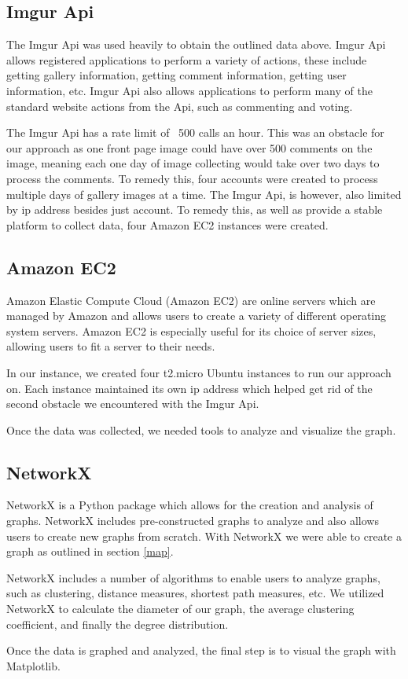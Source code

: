 \documentclass{article}
\begin{document}
\subsection{Imgur Api}
The Imgur Api\cite{imgurapi} was used heavily to obtain the outlined data above. Imgur Api allows registered applications to perform a variety of actions, these include getting gallery information, getting comment information, getting user information, etc. Imgur Api also allows applications to perform many of the standard website actions from the Api, such as commenting and voting. 
\par The Imgur Api has a rate limit of ~500 calls an hour. This was an obstacle for our approach as one front page image could have over 500 comments on the image, meaning each one day of image collecting would take over two days to process the comments. To remedy this, four accounts were created to process multiple days of gallery images at a time. The Imgur Api, is however, also limited by ip address besides just account. To remedy this, as well as provide a stable platform to collect data, four Amazon EC2 instances were created.
\subsection{Amazon EC2}
\par Amazon Elastic Compute Cloud (Amazon EC2) are online servers which are managed by Amazon and allows users to create a variety of different operating system servers\cite{aec2}. Amazon EC2 is especially useful for its choice of server sizes, allowing users to fit a server to their needs. 
\par In our instance, we created four t2.micro Ubuntu instances to run our approach on. Each instance maintained its own ip address which helped get rid of the second obstacle we encountered with the Imgur Api. 
\par Once the data was collected, we needed tools to analyze and visualize the graph.
\subsection{NetworkX}
\par NetworkX is a Python package which allows for the creation and analysis of graphs\cite{hagberg-2008-exploring}. NetworkX includes pre-constructed graphs to analyze and also allows users to create new graphs from scratch. With NetworkX we were able to create a graph as outlined in section \ref{map}.
\par NetworkX includes a number of algorithms to enable users to analyze graphs, such as clustering, distance measures, shortest path measures, etc. 
We utilized NetworkX to calculate the diameter of our graph, the average clustering coefficient, and finally the degree distribution. 
\par Once the data is graphed and analyzed, the final step is to visual the graph with Matplotlib.
\end{document}
